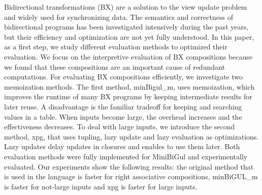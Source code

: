  Bidirectional transformations (BX) are a solution to the view update problem and widely used for synchronizing data. The semantics and correctness of bidirectional programs has been investigated intensively during the past years, but their efficiency and optimization are not yet fully understood. In this paper, as a first step, we study different evaluation methods to optimized their evaluation. We focus on the interpretive evaluation of BX compositions because we found that these compositions are an important cause of redundant computations. 
 For evaluating BX compositions efficiently, we investigate two memoization methods. The first method, minBigul\_m, uses memoization, which improves the runtime of many BX programs by keeping intermediate results for later reuse. A disadvantage is the familiar tradeoff for keeping and searching values in a table.
  When inputs become large, the overhead increases and the effectiveness decreases. To deal with large inputs, we introduce the second method, xpg, that uses tupling, lazy update and lazy evaluation as optimizations. Lazy updates delay updates in closures and enables to use them later.
 Both evaluation methods were fully implemented for MiniBiGul and experimentally evaluated. Our experiments show the following results: the original method that is used in the language is faster for right associative compositions, minBiGUL\_m is faster for not-large inputs and xpg is faster for large inputs.
